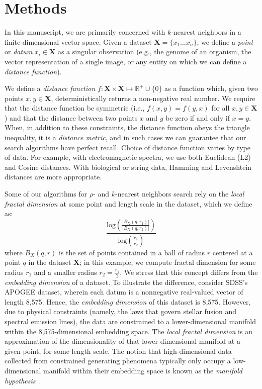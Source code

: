 \section{Methods}
\label{sec:methods}

In this manuscript, we are primarily concerned with $k$-nearest neighbors in a finite-dimensional 
vector space. Given a dataset $\textbf{X} = \{x_1 \dots x_n\}$, we define a \emph{point} or \emph{datum} $x_i \in \textbf{X}$ as a singular observation (e.g., the genome of 
an organism, the vector representation of a single image, or any entity on which we can define a \emph{distance function}).

We define a \emph{distance function} $f : \textbf{X} \times \textbf{X} \mapsto \mathbb{R}^+ \cup \{0\}$ as a function which, 
given two points $x, y \in \textbf{X}$, deterministically returns a non-negative real number. We require that the distance function 
be symmetric (i.e., $f(x, y) = f(y, x)$ for all $x, y \in \textbf{X}$) and that the distance between two points $x$ and $y$ be zero if and only if $x = y$. 
When, in addition to these constraints, the distance function obeys
the triangle inequality, it is a \emph{distance metric}, and in such cases we can guarantee that our search algorithms have perfect recall. 
Choice of distance function varies by type of data. For example, with electromagnetic spectra, we use both 
Euclidean (L2) and Cosine distances. With biological or string data, Hamming and Levenshtein distances are more appropriate.


Some of our algorithms for $\rho$- and $k$-nearest neighbors search rely on the \emph{local fractal dimension} at some point 
and length scale in the dataset, 
which we define as: 
\begin{equation} \frac{\text{log}(\frac{|B_X(q, r_1)|}{|B_X(q, r_2)|})}{\text{log}(\frac{r_1}{r_2}) } \label{1} \end{equation}
where $B_X(q, r)$ is the set of points contained in a ball of radius $r$ 
centered at a point $q$ in the dataset $\textbf{X}$; in this example, we compute fractal dimension for some radius $r_1$ and a smaller radius $r_2 = \frac{r_1}{2}$.
We stress that this concept differs from the \emph{embedding dimension} of a dataset. To illustrate the difference,
consider SDSS's APOGEE dataset, wherein each datum is a nonnegative real-valued vector of length 8,575. Hence, the \emph{embedding dimension} of this dataset is 8,575. 
However, due to physical constraints (namely, the laws that govern stellar fusion and spectral emission lines), the data are constrained to a lower-dimensional 
manifold within the 8,575-dimensional embedding space. The \emph{local fractal dimension} is an approximation of the dimensionality of that lower-dimensional manifold at a given point, for some length scale.
The notion that high-dimensional data collected from constrained generating phenomena typically only occupy a low-dimensional manifold within their embedding space is known as the \emph{manifold hypothesis}~\cite{fefferman2016testing}.


